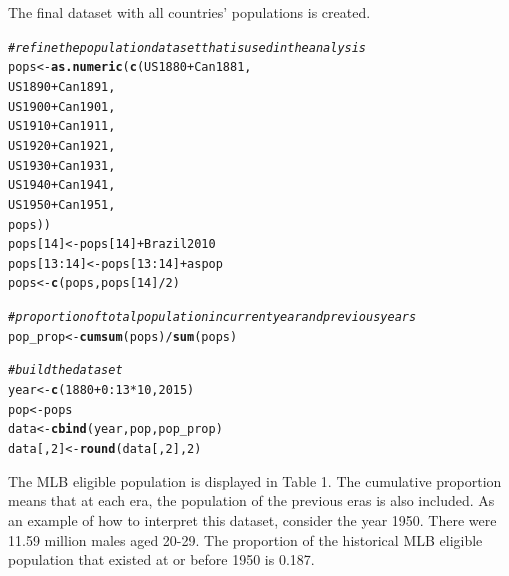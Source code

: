 \documentclass[11pt]{article}\usepackage[]{graphicx}\usepackage[]{color}
\makeatletter
\newcommand{\hlnum}[1]{\textcolor[rgb]{0.686,0.059,0.569}{#1}}%
\newcommand{\hlcom}[1]{\textcolor[rgb]{0.678,0.584,0.686}{\textit{#1}}}%
\newcommand{\hlopt}[1]{\textcolor[rgb]{0,0,0}{#1}}%
\newcommand{\hlstd}[1]{\textcolor[rgb]{0.345,0.345,0.345}{#1}}%
\newcommand{\hlkwb}[1]{\textcolor[rgb]{0.69,0.353,0.396}{#1}}%
\newcommand{\hlkwd}[1]{\textcolor[rgb]{0.737,0.353,0.396}{\textbf{#1}}}%
\newenvironment{kframe}{%
 \def\at@end@of@kframe{}%
 \ifinner\ifhmode%
  \def\at@end@of@kframe{\end{minipage}}%
  \begin{minipage}{\columnwidth}%
 \fi\fi%
 \def\FrameCommand##1{\hskip\@totalleftmargin \hskip-\fboxsep
 \colorbox{shadecolor}{##1}\hskip-\fboxsep
     \hskip-\linewidth \hskip-\@totalleftmargin \hskip\columnwidth}%
 \MakeFramed {\advance\hsize-\width
   \@totalleftmargin\z@ \linewidth\hsize
   \@setminipage}}%
 {\par\unskip\endMakeFramed%
 \at@end@of@kframe}
\newenvironment{knitrout}{}{} %
\makeatother
\begin{document}
The final dataset with all countries' populations is created. 

\begin{knitrout}
\color{fgcolor}\begin{kframe}
\begin{alltt}
\hlcom{# refine the population dataset that is used in the analysis}
\hlstd{pops} \hlkwb{<-} \hlkwd{as.numeric}\hlstd{(}\hlkwd{c}\hlstd{(US1880} \hlopt{+} \hlstd{Can1881,}
  \hlstd{US1890} \hlopt{+} \hlstd{Can1891,}
  \hlstd{US1900} \hlopt{+} \hlstd{Can1901,}
  \hlstd{US1910} \hlopt{+} \hlstd{Can1911,}
  \hlstd{US1920} \hlopt{+} \hlstd{Can1921,}
  \hlstd{US1930} \hlopt{+} \hlstd{Can1931,}
  \hlstd{US1940} \hlopt{+} \hlstd{Can1941,}
  \hlstd{US1950} \hlopt{+} \hlstd{Can1951,}
  \hlstd{pops))}
\hlstd{pops[}\hlnum{14}\hlstd{]} \hlkwb{<-} \hlstd{pops[}\hlnum{14}\hlstd{]} \hlopt{+} \hlstd{Brazil2010}
\hlstd{pops[}\hlnum{13}\hlopt{:}\hlnum{14}\hlstd{]} \hlkwb{<-} \hlstd{pops[}\hlnum{13}\hlopt{:}\hlnum{14}\hlstd{]} \hlopt{+} \hlstd{aspop}
\hlstd{pops} \hlkwb{<-} \hlkwd{c}\hlstd{(pops, pops[}\hlnum{14}\hlstd{]}\hlopt{/}\hlnum{2}\hlstd{)}

\hlcom{# proportion of total population in current year and previous years}
\hlstd{pop_prop} \hlkwb{<-} \hlkwd{cumsum}\hlstd{(pops)} \hlopt{/} \hlkwd{sum}\hlstd{(pops)}

\hlcom{# build the dataset}
\hlstd{year} \hlkwb{<-} \hlkwd{c}\hlstd{(}\hlnum{1880} \hlopt{+} \hlnum{0}\hlopt{:}\hlnum{13} \hlopt{*} \hlnum{10}\hlstd{,} \hlnum{2015}\hlstd{)}
\hlstd{pop} \hlkwb{<-} \hlstd{pops}
\hlstd{data} \hlkwb{<-} \hlkwd{cbind}\hlstd{(year, pop, pop_prop)}
\hlstd{data[,} \hlnum{2}\hlstd{]} \hlkwb{<-} \hlkwd{round}\hlstd{(data[,} \hlnum{2}\hlstd{],} \hlnum{2}\hlstd{)}
\end{alltt}
\end{kframe}
\end{knitrout}

The MLB eligible population is displayed in Table 1.
The cumulative proportion means that at each era, the population of the 
previous eras is also included. As an example of how to interpret this 
dataset, consider the year 1950. There were 11.59 
million males aged 20-29. The proportion of the historical MLB eligible 
population that existed at or before 1950 is 0.187. 
\end{document}
